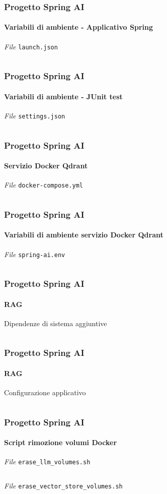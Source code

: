%
\begin{frame}[t,fragile] \frametitle{Progetto Spring AI}
    \framesubtitle{Variabili di ambiente - Applicativo Spring}
        \begin{block}{\textit{File} \texttt{launch.json}}
			{\tiny\inputminted{json}{code/launch.json}}
    	\end{block}
\end{frame}
%
\begin{frame}[t,fragile] \frametitle{Progetto Spring AI}
    \framesubtitle{Variabili di ambiente - JUnit test}
        \begin{block}{\textit{File} \texttt{settings.json}}
			{\tiny\inputminted{json}{code/settings.json}}
    	\end{block}
\end{frame}
%
\begin{frame}[t,fragile] \frametitle{Progetto Spring AI}
    \framesubtitle{Servizio Docker Qdrant}
        \begin{block}{\textit{File} \texttt{docker-compose.yml}}
			{\tiny\inputminted{yaml}{code/docker-compose.yml}}
    	\end{block}
\end{frame}
%
\begin{frame}[t,fragile] \frametitle{Progetto Spring AI}
    \framesubtitle{Variabili di ambiente servizio Docker Qdrant}
        \begin{block}{\textit{File} \texttt{spring-ai.env}}
			{\tiny\inputminted{text}{code/spring-ai.env}}
    	\end{block}
\end{frame}
%
\begin{frame}[t,fragile] \frametitle{Progetto Spring AI}
    \framesubtitle{RAG}
        \begin{block}{Dipendenze di sistema aggiuntive}
			{\tiny\inputminted{xml}{code/pom.xml}}
    	\end{block}
\end{frame}
%
\begin{frame}[t,fragile] \frametitle{Progetto Spring AI}
    \framesubtitle{RAG}
        \begin{block}{Configurazione applicativo}
			{\tiny\inputminted{yaml}{code/application.yml}}
    	\end{block}
\end{frame}
%
\begin{frame}[t,fragile] \frametitle{Progetto Spring AI}
    \framesubtitle{Script rimozione volumi Docker}
        \begin{block}{\textit{File} \texttt{erase\_llm\_volumes.sh}}
			{\tiny\inputminted{bash}{code/erase_llm_volumes.sh}}
    	\end{block}
        \begin{block}{\textit{File} \texttt{erase\_vector\_store\_volumes.sh}}
			{\tiny\inputminted{bash}{code/erase_vector_store_volumes.sh}}
    	\end{block}
\end{frame}
